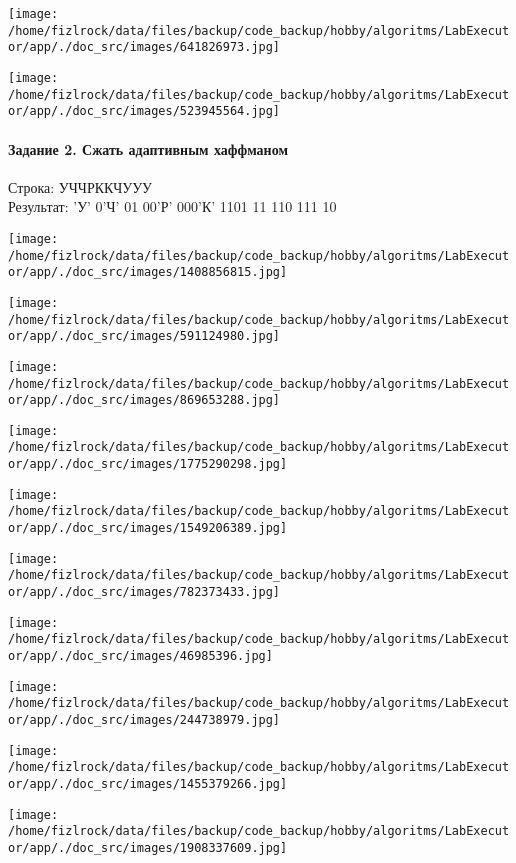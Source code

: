 \documentclass[a4paper, 12pt]{article}
\begin{document}
\texttt{[image: /home/fizlrock/data/files/backup/code\_backup/hobby/algoritms/LabExecutor/app/./doc\_src/images/641826973.jpg]}

\texttt{[image: /home/fizlrock/data/files/backup/code\_backup/hobby/algoritms/LabExecutor/app/./doc\_src/images/523945564.jpg]}
\pagebreak
\paragraph{Задание 2. Сжать адаптивным хаффманом\\}

Строка: 
УЧЧРККЧУУУ\\
Результат: 'У' 0'Ч' 01 00'Р' 000'К' 1101 11 110 111 10

\texttt{[image: /home/fizlrock/data/files/backup/code\_backup/hobby/algoritms/LabExecutor/app/./doc\_src/images/1408856815.jpg]}

\texttt{[image: /home/fizlrock/data/files/backup/code\_backup/hobby/algoritms/LabExecutor/app/./doc\_src/images/591124980.jpg]}

\texttt{[image: /home/fizlrock/data/files/backup/code\_backup/hobby/algoritms/LabExecutor/app/./doc\_src/images/869653288.jpg]}

\texttt{[image: /home/fizlrock/data/files/backup/code\_backup/hobby/algoritms/LabExecutor/app/./doc\_src/images/1775290298.jpg]}

\texttt{[image: /home/fizlrock/data/files/backup/code\_backup/hobby/algoritms/LabExecutor/app/./doc\_src/images/1549206389.jpg]}

\texttt{[image: /home/fizlrock/data/files/backup/code\_backup/hobby/algoritms/LabExecutor/app/./doc\_src/images/782373433.jpg]}

\texttt{[image: /home/fizlrock/data/files/backup/code\_backup/hobby/algoritms/LabExecutor/app/./doc\_src/images/46985396.jpg]}

\texttt{[image: /home/fizlrock/data/files/backup/code\_backup/hobby/algoritms/LabExecutor/app/./doc\_src/images/244738979.jpg]}

\texttt{[image: /home/fizlrock/data/files/backup/code\_backup/hobby/algoritms/LabExecutor/app/./doc\_src/images/1455379266.jpg]}

\texttt{[image: /home/fizlrock/data/files/backup/code\_backup/hobby/algoritms/LabExecutor/app/./doc\_src/images/1908337609.jpg]}
\pagebreak
\end{document}
